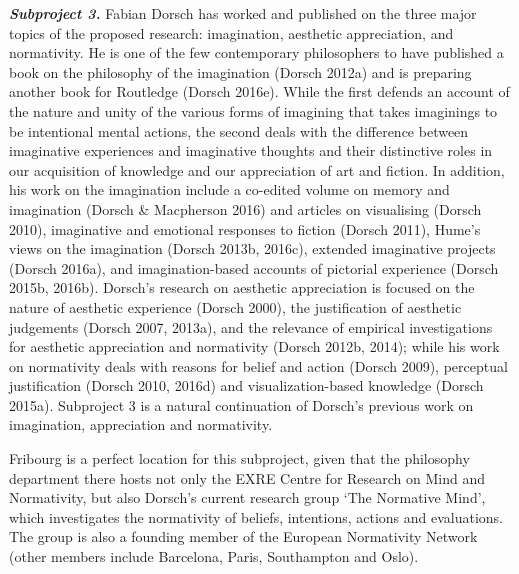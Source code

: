 \vspace{.2cm}
\noindent \textbf{\emph{Subproject 3.}} Fabian Dorsch has worked and published on the three major topics of the proposed research: imagination, aesthetic appreciation, and normativity. He is one of the few contemporary philosophers to have published a book on the philosophy of the imagination (Dorsch 2012a) and is preparing another book for Routledge (Dorsch 2016e). While the first defends an account of the nature and unity of the various forms of imagining that takes imaginings to be intentional mental actions, the second deals with the difference between imaginative experiences and imaginative thoughts and their distinctive roles in our acquisition of knowledge and our appreciation of art and fiction. In addition, his work on the imagination include a co-edited volume on memory and imagination (Dorsch \& Macpherson 2016) and articles on visualising (Dorsch 2010), imaginative and emotional responses to fiction (Dorsch 2011), Hume's views on the imagination (Dorsch 2013b, 2016c), extended imaginative projects (Dorsch 2016a), and imagination-based accounts of pictorial experience (Dorsch 2015b, 2016b). Dorsch's research on aesthetic appreciation is focused on the nature of aesthetic experience (Dorsch 2000), the justification of aesthetic judgements (Dorsch 2007, 2013a), and the relevance of empirical investigations for aesthetic appreciation and normativity (Dorsch 2012b, 2014); while his work on normativity deals with reasons for belief and action (Dorsch 2009), perceptual justification (Dorsch 2010, 2016d) and visualization-based knowledge (Dorsch 2015a). Subproject 3 is a natural continuation of Dorsch's previous work on imagination, appreciation and normativity.

Fribourg is a perfect location for this subproject, given that the philosophy department there hosts not only the EXRE Centre for Research on Mind and Normativity, but also Dorsch's current research group `The Normative Mind', which investigates the normativity of beliefs, intentions, actions and evaluations. The group is also a founding member of the European Normativity Network (other members include Barcelona, Paris, Southampton and Oslo). 
